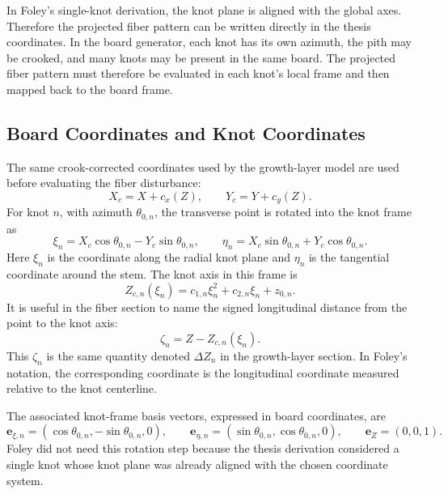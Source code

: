 \documentclass[11pt]{article}
\begin{document}
In Foley's single-knot derivation, the knot plane is aligned with the global axes. Therefore the projected
fiber pattern can be written directly in the thesis coordinates. In the board generator, each knot has its own
azimuth, the pith may be crooked, and many knots may be present in the same board. The projected fiber pattern
must therefore be evaluated in each knot's local frame and then mapped back to the board frame.

\subsection{Board Coordinates and Knot Coordinates}

The same crook-corrected coordinates used by the growth-layer model are used before evaluating the fiber
disturbance:
\begin{equation}
X_c = X + c_x(Z),
\qquad
Y_c = Y + c_y(Z).
\end{equation}
For knot $n$, with azimuth $\theta_{0,n}$, the transverse point is rotated into the knot frame as
\begin{equation}
\xi_n = X_c \cos\theta_{0,n} - Y_c \sin\theta_{0,n},
\qquad
\eta_n = X_c \sin\theta_{0,n} + Y_c \cos\theta_{0,n}.
\end{equation}
Here $\xi_n$ is the coordinate along the radial knot plane and $\eta_n$ is the tangential coordinate around the
stem. The knot axis in this frame is
\begin{equation}
Z_{c,n}(\xi_n)=c_{1,n}\xi_n^2+c_{2,n}\xi_n+z_{0,n}.
\end{equation}
It is useful in the fiber section to name the signed longitudinal distance from the point to the knot axis:
\begin{equation}
\zeta_n = Z - Z_{c,n}(\xi_n).
\end{equation}
This $\zeta_n$ is the same quantity denoted $\Delta Z_n$ in the growth-layer section. In Foley's notation, the
corresponding coordinate is the longitudinal coordinate measured relative to the knot centerline.

The associated knot-frame basis vectors, expressed in board coordinates, are
\begin{equation}
\bm{e}_{\xi,n}=(\cos\theta_{0,n},-\sin\theta_{0,n},0),
\qquad
\bm{e}_{\eta,n}=(\sin\theta_{0,n},\cos\theta_{0,n},0),
\qquad
\bm{e}_Z=(0,0,1).
\end{equation}
Foley did not need this rotation step because the thesis derivation considered a single knot whose knot plane
was already aligned with the chosen coordinate system.
\end{document}
